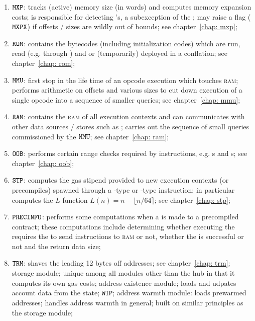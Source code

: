 \begin{enumerate}
		word comparison module;
		deals with opcodes performing integer comparisons;
		see chapter~\ref{chap: wcp};
	\item $\texttt{MXP}{}$:
		tracks (active) memory size (in \evm{} words) and computes memory expansion costs;
		is responsible for detecting \mxpxSH{}'s, a subexception of the \oogxSH{};
		may raise a flag ($\texttt{MXPX}$) if offsets / sizes are wildly out of bounds;
		see chapter~\ref{chap: mxp};
	\item $\texttt{ROM}{}$:
		contains the bytecodes (including initialization codes) which are run, read (e.g. through ) and or (temporarily) deployed in a conflation;
		see chapter~\ref{chap: rom};
	\item $\texttt{MMU}{}$:
		first stop in the life time of an opcode execution which touches \textsc{ram};
		performs arithmetic on offsets and various sizes to cut down execution of a single opcode into a sequence of smaller queries;
		see chapter~\ref{chap: mmu};
	\item $\texttt{RAM}{}$:
		contains the \textsc{ram} of all execution contexts and can communicates with other data sources / stores such as \romMod{};
		carries out the sequence of small queries commissioned by the $\texttt{MMU}{}$;
		see chapter~\ref{chap: ram};
	\item $\texttt{OOB}{}$:
		performs certain range checks required by instructions, e.g. s and s;
		see chapter~\ref{chap: oob};
	\item $\texttt{STP}$:
		computes the gas stipend provided to new execution contexts (or precompiles) spawned through a -type or -type instruction;
		in particular computes the $L$ function $L(n) = n - \lfloor n/64 \rceil$; 
		see chapter~\ref{chap: stp};
	\item $\texttt{PRECINFO}$:
		performs some computations when a  is made to a precompiled contract;
		these computations include determining whether executing the  requires the \hubMod{} to send instructions to \textsc{ram} or not, whether the  is successful or not and the return data size; 
	\item $\texttt{TRM}{}$:
		shaves the leading 12 bytes off addresses; see chapter~\ref{chap: trm};
			storage module; unique among all modules other than the hub in that it computes its own gas costs;
		address existence module; loads and udpates account data from the state; \texttt{WIP};
			address warmth module: loads prewarmed addresses; handles address warmth in general; built on similar principles as the storage module;
\end{enumerate}
